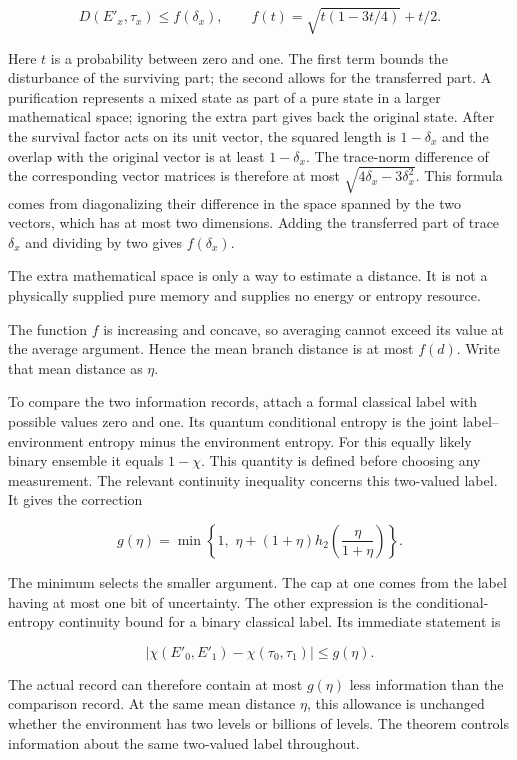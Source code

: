 \documentclass[11pt,letterpaper]{article}
\begin{document}
\[D\left( E\prime_{x},\tau_{x} \right) \leq f\left( \delta_{x} \right),\quad\quad f(t) = \sqrt{t(1 - 3t/4)} + t/2.\]

Here \(t\) is a probability between zero and one. The first term bounds the disturbance of the surviving part; the second allows for the transferred part. A purification represents a mixed state as part of a pure state in a larger mathematical space; ignoring the extra part gives back the original state. After the survival factor acts on its unit vector, the squared length is \(1 - \delta_{x}\) and the overlap with the original vector is at least \(1 - \delta_{x}\). The trace-norm difference of the corresponding vector matrices is therefore at most \(\sqrt{4\delta_{x} - 3\delta_{x}^{2}}\). This formula comes from diagonalizing their difference in the space spanned by the two vectors, which has at most two dimensions. Adding the transferred part of trace \(\delta_{x}\) and dividing by two gives \(f\left( \delta_{x} \right)\).

The extra mathematical space is only a way to estimate a distance. It is not a physically supplied pure memory and supplies no energy or entropy resource.

The function \(f\) is increasing and concave, so averaging cannot exceed its value at the average argument. Hence the mean branch distance is at most \(f(d)\). Write that mean distance as \(\eta\).

To compare the two information records, attach a formal classical label with possible values zero and one. Its quantum conditional entropy is the joint label--environment entropy minus the environment entropy. For this equally likely binary ensemble it equals \(1 - \chi\). This quantity is defined before choosing any measurement. The relevant continuity inequality concerns this two-valued label. It gives the correction

\[g(\eta) = \min\left\{ 1,\mspace{6mu}\eta + (1 + \eta)h_{2}\left( \frac{\eta}{1 + \eta} \right) \right\}.\]

The minimum selects the smaller argument. The cap at one comes from the label having at most one bit of uncertainty. The other expression is the conditional-entropy continuity bound for a binary classical label. Its immediate statement is

\[\left| \chi\left( E\prime_{0},E\prime_{1} \right) - \chi\left( \tau_{0},\tau_{1} \right) \right| \leq g(\eta).\]

The actual record can therefore contain at most \(g(\eta)\) less information than the comparison record. At the same mean distance \(\eta\), this allowance is unchanged whether the environment has two levels or billions of levels. The theorem controls information about the same two-valued label throughout.
\end{document}
